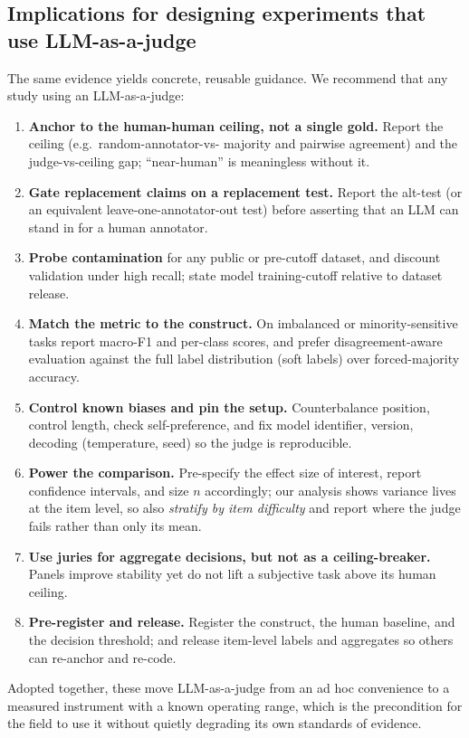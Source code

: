 \subsection{Implications for designing experiments that use LLM-as-a-judge}
The same evidence yields concrete, reusable guidance. We recommend that any study using an LLM-as-a-judge:
\begin{enumerate}[leftmargin=1.5em,itemsep=2pt]
\item \textbf{Anchor to the human-human ceiling, not a single gold.} Report the ceiling (e.g.\ random-annotator-vs-
majority and pairwise agreement) and the judge-vs-ceiling gap; ``near-human'' is meaningless without it.
\item \textbf{Gate replacement claims on a replacement test.} Report the alt-test \citep{calderon2025alttest} (or an
equivalent leave-one-annotator-out test) before asserting that an LLM can stand in for a human annotator.
\item \textbf{Probe contamination} for any public or pre-cutoff dataset, and discount validation under high recall;
state model training-cutoff relative to dataset release.
\item \textbf{Match the metric to the construct.} On imbalanced or minority-sensitive tasks report macro-F1 and
per-class scores, and prefer disagreement-aware evaluation against the full label distribution (soft labels) over
forced-majority accuracy.
\item \textbf{Control known biases and pin the setup.} Counterbalance position, control length, check
self-preference, and fix model identifier, version, decoding (temperature, seed) so the judge is reproducible.
\item \textbf{Power the comparison.} Pre-specify the effect size of interest, report confidence intervals, and size
$n$ accordingly; our analysis shows variance lives at the item level, so also \emph{stratify by item difficulty} and
report where the judge fails rather than only its mean.
\item \textbf{Use juries for aggregate decisions, but not as a ceiling-breaker.} Panels improve stability yet do not
lift a subjective task above its human ceiling.
\item \textbf{Pre-register and release.} Register the construct, the human baseline, and the decision threshold; and
release item-level labels and aggregates so others can re-anchor and re-code.
\end{enumerate}
Adopted together, these move LLM-as-a-judge from an ad hoc convenience to a measured instrument with a known
operating range, which is the precondition for the field to use it without quietly degrading its own standards of
evidence.

